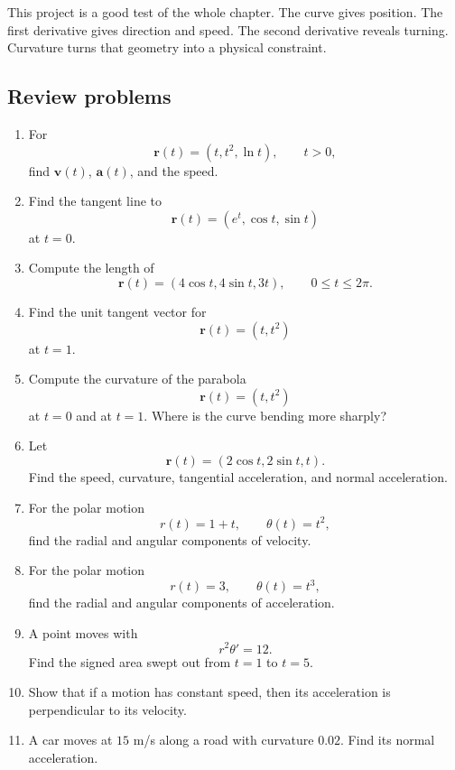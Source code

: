 This project is a good test of the whole chapter.  The curve gives position.  The first
derivative gives direction and speed.  The second derivative reveals turning.  Curvature
turns that geometry into a physical constraint.

\subsection{Review problems}

\begin{enumerate}
\item For
\[
    \mathbf r(t)=(t,t^2,\ln t),
    \qquad t>0,
\]
find \(\mathbf v(t)\), \(\mathbf a(t)\), and the speed.

\item Find the tangent line to
\[
    \mathbf r(t)=(e^t,\cos t,\sin t)
\]
at \(t=0\).

\item Compute the length of
\[
    \mathbf r(t)=(4\cos t,4\sin t,3t),
    \qquad 0\le t\le2\pi.
\]

\item Find the unit tangent vector for
\[
    \mathbf r(t)=(t,t^2)
\]
at \(t=1\).

\item Compute the curvature of the parabola
\[
    \mathbf r(t)=(t,t^2)
\]
at \(t=0\) and at \(t=1\).  Where is the curve bending more sharply?

\item Let
\[
    \mathbf r(t)=(2\cos t,2\sin t,t).
\]
Find the speed, curvature, tangential acceleration, and normal acceleration.

\item For the polar motion
\[
    r(t)=1+t,
    \qquad
    \theta(t)=t^2,
\]
find the radial and angular components of velocity.

\item For the polar motion
\[
    r(t)=3,
    \qquad
    \theta(t)=t^3,
\]
find the radial and angular components of acceleration.

\item A point moves with
\[
    r^2\theta'=12.
\]
Find the signed area swept out from \(t=1\) to \(t=5\).

\item Show that if a motion has constant speed, then its acceleration is perpendicular
to its velocity.

\item A car moves at \(15\) m/s along a road with curvature \(0.02\).  Find its normal
acceleration.


\end{enumerate}
